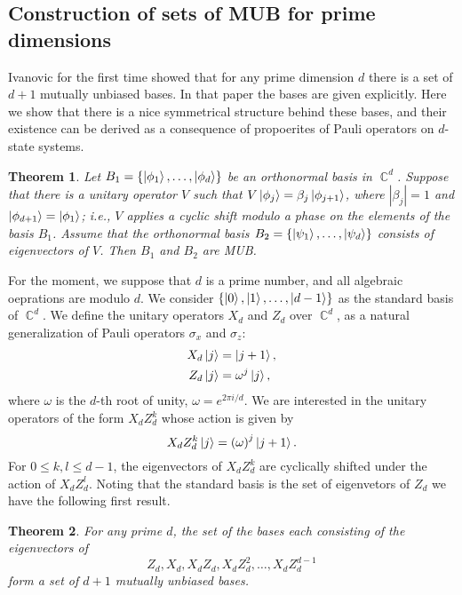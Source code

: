 \documentclass[a4paper]{article}
\DeclareMathOperator{\C}{\mathbb{C}}
\newtheorem{theorem}{Theorem}
\begin{document}
  \subsection{Construction of sets of MUB for prime
  dimensions}

  Ivanovic for the first time showed that for any prime
  dimension $d$ there is a set of $d+1$ mutually unbiased
  bases. In that paper the bases are given explicitly. Here
  we show that there is a nice symmetrical structure behind
  these bases, and their existence can be derived as a
  consequence of propoerites of Pauli operators on $d$-state
  systems.

  \begin{theorem}
    Let $B_1 = \{\ket{\phi_1},\ldots,\ket{\phi_d}\}$ be an
    orthonormal basis in $\C^{d}$. Suppose that there is a
    unitary operator $V$ such that $V\ket{\phi_j} = \beta_j
    \ket{\phi_{j+1}}$, where $|\beta_j| = 1$ and
    $\ket{\phi_{d+1}} = \ket{\phi_1}$; i.e., $V$ applies a
    cyclic shift modulo a phase on the elements of the basis
    $B_1$. Assume that the orthonormal basis $B_2 =
    \{\ket{\psi_1},\ldots,\ket{\psi_d}\}$ consists of
    eigenvectors of $V$. Then $B_1$ and $B_2$ are MUB.
  \end{theorem}

  For the moment, we suppose that $d$ is a prime number, and
  all algebraic oeprations are modulo $d$. We consider
  $\{\ket 0, \ket 1, \ldots, \ket{d-1}\}$ as the standard
  basis of $\C^{d}$. We define the unitary operators $X_d$ 
  and $Z_d$ over $\C^{d}$, as a natural generalization of
  Pauli operators $\sigma_x$ and $\sigma_z$:
  \begin{align*}
    X_d \ket j &= \ket{j+1},\\
    Z_d \ket j &= \omega^{j} \ket j,
  \end{align*}
  where $\omega$ is the $d$-th root of unity, $\omega =
  e^{2\pi i / d}$. We are interested in the unitary
  operators of the form $X_d Z_d^{k}$ whose action is given
  by
  \[
    X_d Z_d^{k} \ket j
    = \left( \omega \right)^{j} \ket{j+1}.
  \] 
  For $0 \leq k,l \leq d - 1$, the eigenvectors of $X_d
  Z_d^{k}$ are cyclically shifted under the action of $X_d
  Z_d^{l}$. Noting that the standard basis is the set of
  eigenvetors of $Z_d$ we have the following first result.
  \begin{theorem}
    For any prime $d$, the set of the bases each consisting
    of the eigenvectors of
    \[
      Z_d, X_d, X_d Z_d, X_d Z_d^2,\ldots,X_d Z_d^{d-1}
    \] 
    form a set of $d+1$ mutually unbiased bases.
  \end{theorem}
\end{document}
